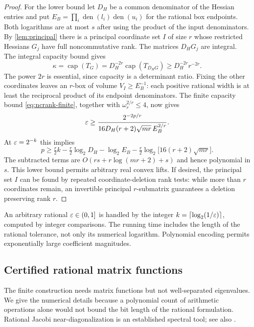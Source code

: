 \begin{proof}
For the lower bound let $D_H$ be a common denominator of the Hessian
entries and put $E_B=\prod_i\operatorname{den}(l_i)\operatorname{den}(u_i)$
for the rational box endpoints. Both logarithms are at most $s$ after
using the product of the input denominators. By \cref{lem:principal}
there is a principal coordinate set $I$ of size $r$ whose restricted
Hessians $G_j$ have full noncommutative rank. The matrices $D_HG_j$
are integral. The integral capacity bound
\citep[Theorem 2.18]{ggow2020} gives
\[
 \kappa=\operatorname{cap}(T_G)
 =D_H^{-2r}\operatorname{cap}(T_{D_HG})
 \ge D_H^{-2r}r^{-2r}.
\]
The power $2r$ is essential, since capacity is a determinant ratio.
Fixing the other coordinates leaves an $r$-box of volume
$V_I\ge E_B^{-1}$: each positive rational width is at least the
reciprocal product of its endpoint denominators. The finite capacity
bound \eqref{eq:ncrank-finite}, together with
$\omega_r^{2/r}\le4$, now gives
\[
 \varepsilon\ge
 \frac{2^{-2p/r}}{16D_H(r+2)\sqrt{mr}\,E_B^{2/r}}.
\]
At $\varepsilon=2^{-k}$ this implies
\begin{equation}\label{eq:rational-ncrank-lower-explicit}
 p\ge\tfrac r2 k-\tfrac r2\log_2D_H-\log_2E_B
       -\tfrac r2\log_2\!\bigl[16(r+2)\sqrt{mr}\bigr].
\end{equation}
The subtracted terms are $O(rs+r\log(mr+2)+s)$ and hence polynomial
in $s$. This lower bound permits arbitrary real convex lifts. If desired,
the principal set $I$ can be found by repeated coordinate-deletion rank
tests: while more than $r$ coordinates remain, an invertible principal
$r$-submatrix guarantees a deletion preserving rank $r$.
\end{proof}

An arbitrary rational $\varepsilon\in(0,1]$ is handled by the integer
$k=\lceil\log_2(1/\varepsilon)\rceil$, computed by integer comparisons. The
running time includes the length of the rational tolerance, not only its
numerical logarithm. Polynomial encoding permits exponentially large
coefficient magnitudes.

\subsection{Certified rational matrix functions}\label{subsec:matrix-functions}

The finite construction needs matrix functions but not well-separated
eigenvalues. We give the numerical details because a polynomial count
of arithmetic operations alone would not bound the bit length of the
rational formulation. Rational Jacobi near-diagonalization is an
established spectral tool; see also \citet[Theorem 2]{delpia2026}.

